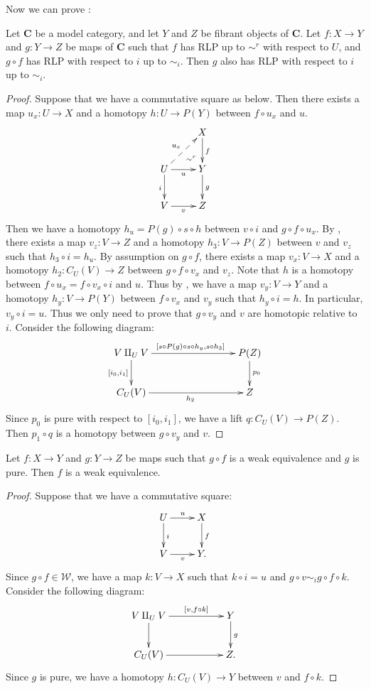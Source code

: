 \documentclass{amsart}
\theoremstyle{definition}
\newcommand{\we}{\mathcal{W}}
\newcommand{\cat}[1]{\mathbf{#1}}
\newcommand{\C}{\cat{C}}
\newcommand{\cyli}{i}
\begin{document}
Now we can prove :

\begin{lem}
Let $\C$ be a model category, and let $Y$ and $Z$ be fibrant objects of $\C$.
Let $f : X \to Y$ and $g : Y \to Z$ be maps of $\C$ such that $f$ has RLP up to $\sim^r$ with respect to $U$, and $g \circ f$ has RLP with respect to $i$ up to $\sim_i$.
Then $g$ also has RLP with respect to $i$ up to $\sim_i$.
\end{lem}
\begin{proof}
Suppose that we have a commutative square as below.
Then there exists a map $u_x : U \to X$ and a homotopy $h : U \to P(Y)$ between $f \circ u_x$ and $u$.
\[ \xymatrix{   \ar@{}[dr]|(.7){\sim^r}               & X \ar[d]^f \\
              U \ar@{-->}[ur]^{u_x} \ar[d]_i \ar[r]_u & Y \ar[d]^g \\
              V \ar[r]_v                              & Z
            } \]
Then we have a homotopy $h_u = P(g) \circ s \circ h$ between $v \circ i$ and $g \circ f \circ u_x$.
By , there exists a map $v_z : V \to Z$ and a homotopy $h_3 : V \to P(Z)$ between $v$ and $v_z$ such that $h_3 \circ i = h_u$.
By assumption on $g \circ f$, there exists a map $v_x : V \to X$ and a homotopy $h_2 : C_U(V) \to Z$ between $g \circ f \circ v_x$ and $v_z$.
Note that $h$ is a homotopy between $f \circ u_x = f \circ v_x \circ i$ and $u$.
Thus by , we have a map $v_y : V \to Y$ and a homotopy $h_y : V \to P(Y)$ between $f \circ v_x$ and $v_y$ such that $h_y \circ i = h$.
In particular, $v_y \circ i = u$.
Thus we only need to prove that $g \circ v_y$ and $v$ are homotopic relative to $i$.
Consider the following diagram:
\[ \xymatrix{ V \amalg_U V \ar[rrr]^{[s \circ P(g) \circ s \circ h_y, s \circ h_3]} \ar[d]_{[\cyli_0,\cyli_1]} & & & P(Z) \ar[d]^{p_0} \\
              C_U(V) \ar[rrr]_{h_2} & & & Z
            } \]
Since $p_0$ is pure with respect to $[\cyli_0,\cyli_1]$, we have a lift $q : C_U(V) \to P(Z)$.
Then $p_1 \circ q$ is a homotopy between $g \circ v_y$ and $v$.
\end{proof}

\begin{lem}
Let $f : X \to Y$ and $g : Y \to Z$ be maps such that $g \circ f$ is a weak equivalence and $g$ is pure.
Then $f$ is a weak equivalence.
\end{lem}
\begin{proof}
Suppose that we have a commutative square:
\[ \xymatrix{ U \ar[r]^u \ar[d]^i & X \ar[d]^f \\
              V \ar[r]_v          & Y.
            } \]
Since $g \circ f \in \we$, we have a map $k : V \to X$ such that $k \circ i = u$ and $g \circ v \sim_i g \circ f \circ k$.
Consider the following diagram:
\[ \xymatrix{ V \amalg_U V \ar[rr]^-{[v, f \circ k]} \ar[d] & & Y \ar[d]^g \\
              C_U(V)       \ar[rr]                          & & Z.
            } \]
Since $g$ is pure, we have a homotopy $h : C_U(V) \to Y$ between $v$ and $f \circ k$.
\end{proof}
\end{document}
